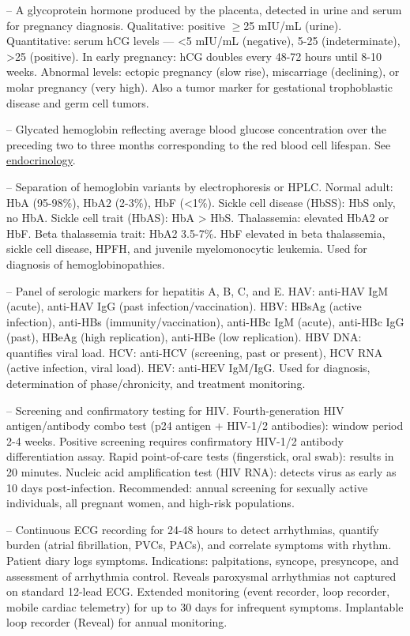 -- A glycoprotein hormone produced by the placenta, detected in urine and serum for pregnancy diagnosis. Qualitative: positive \(\ge\)25 mIU/mL (urine). Quantitative: serum hCG levels — <5 mIU/mL (negative), 5-25 (indeterminate), >25 (positive). In early pregnancy: hCG doubles every 48-72 hours until 8-10 weeks. Abnormal levels: ectopic pregnancy (slow rise), miscarriage (declining), or molar pregnancy (very high). Also a tumor marker for gestational trophoblastic disease and germ cell tumors.

-- Glycated hemoglobin reflecting average blood glucose concentration over the preceding two to three months corresponding to the red blood cell lifespan. See \hyperlink{Endocrinology}{endocrinology}.

-- Separation of hemoglobin variants by electrophoresis or HPLC. Normal adult: HbA (95-98\%), HbA2 (2-3\%), HbF (<1\%). Sickle cell disease (HbSS): HbS only, no HbA. Sickle cell trait (HbAS): HbA > HbS. Thalassemia: elevated HbA2 or HbF. Beta thalassemia trait: HbA2 3.5-7\%. HbF elevated in beta thalassemia, sickle cell disease, HPFH, and juvenile myelomonocytic leukemia. Used for diagnosis of hemoglobinopathies.

-- Panel of serologic markers for hepatitis A, B, C, and E. HAV: anti-HAV IgM (acute), anti-HAV IgG (past infection/vaccination). HBV: HBsAg (active infection), anti-HBs (immunity/vaccination), anti-HBc IgM (acute), anti-HBc IgG (past), HBeAg (high replication), anti-HBe (low replication). HBV DNA: quantifies viral load. HCV: anti-HCV (screening, past or present), HCV RNA (active infection, viral load). HEV: anti-HEV IgM/IgG. Used for diagnosis, determination of phase/chronicity, and treatment monitoring.

-- Screening and confirmatory testing for HIV. Fourth-generation HIV antigen/antibody combo test (p24 antigen + HIV-1/2 antibodies): window period 2-4 weeks. Positive screening requires confirmatory HIV-1/2 antibody differentiation assay. Rapid point-of-care tests (fingerstick, oral swab): results in 20 minutes. Nucleic acid amplification test (HIV RNA): detects virus as early as 10 days post-infection. Recommended: annual screening for sexually active individuals, all pregnant women, and high-risk populations.

-- Continuous ECG recording for 24-48 hours to detect arrhythmias, quantify burden (atrial fibrillation, PVCs, PACs), and correlate symptoms with rhythm. Patient diary logs symptoms. Indications: palpitations, syncope, presyncope, and assessment of arrhythmia control. Reveals paroxysmal arrhythmias not captured on standard 12-lead ECG. Extended monitoring (event recorder, loop recorder, mobile cardiac telemetry) for up to 30 days for infrequent symptoms. Implantable loop recorder (Reveal) for annual monitoring.

